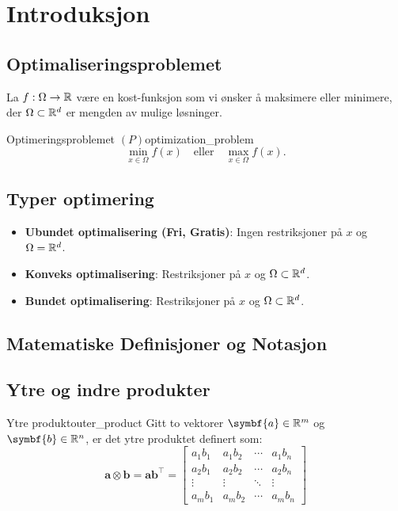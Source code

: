\chapter{Introduksjon}

\section{Optimaliseringsproblemet}

La \(f: \Omega \to \mathbb{R}\) være en kost-funksjon som vi ønsker å maksimere eller minimere, der \(\Omega \subset \mathbb{R}^d\) er mengden av mulige løsninger.

\begin{definition}{Optimeringsproblemet \((P)\)}{optimization_problem}
  \[
    \min_{x \in \Omega} f(x) \quad \text{eller} \quad \max_{x \in \Omega} f(x).
  \]

\end{definition}

\section*{Typer optimering}

\begin{itemize}
  \item \textbf{Ubundet optimalisering (Fri, Gratis)}: Ingen restriksjoner på \(x\) og \(\Omega = \mathbb{R}^d\).
  \item \textbf{Konveks optimalisering}: Restriksjoner på \(x\) og \(\Omega \subset \mathbb{R}^d\).
  \item \textbf{Bundet optimalisering}: Restriksjoner på \(x\) og \(\Omega \subset \mathbb{R}^d\).
\end{itemize}

\section{Matematiske Definisjoner og Notasjon}

\section{Ytre og indre produkter}
\begin{definition}{Ytre produkt}{outer_product}
  Gitt to vektorer \( \symbf{a} \in \R^m \) og \( \symbf{b} \in \R^n \), er det ytre produktet definert som:
  \[
    \symbf{a} \otimes \symbf{b} = \symbf{a} \symbf{b}^\top =
    \begin{bmatrix}
      a_1b_1 & a_1b_2 & \cdots & a_1b_n \\
      a_2b_1 & a_2b_2 & \cdots & a_2b_n \\
      \vdots & \vdots & \ddots & \vdots \\
      a_mb_1 & a_mb_2 & \cdots & a_mb_n
    \end{bmatrix}
  \]
\end{definition}

